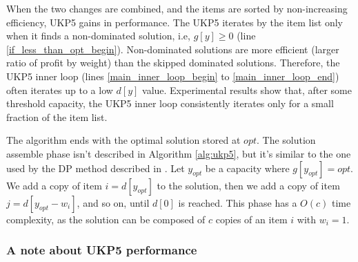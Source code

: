 \documentclass[runningheads,a4paper]{llncs}
\begin{document}
When the two changes are combined, and the items are sorted by non-increasing efficiency, UKP5 gains in performance. 
The UKP5 iterates by the item list only when it finds a non-dominated solution, i.e, \(g[y] \geq 0\) (line \ref{if_less_than_opt_begin}). 
Non-dominated solutions are more efficient (larger ratio of profit by weight) than the skipped dominated solutions. 
Therefore, the UKP5 inner loop (lines \ref{main_inner_loop_begin} to \ref{main_inner_loop_end}) often iterates up to a low \(d[y]\) value. 
Experimental results show that, after some threshold capacity, the UKP5 inner loop consistently iterates only for a small fraction of the item list.


The algorithm ends with the optimal solution stored at \(opt\). The solution assemble phase isn't described in Algorithm \ref{alg:ukp5}, but it's similar to the one used by the DP method described in \cite[p. 221, Steps 6-8]{gar72}. 
Let \(y_{opt}\) be a capacity where \(g[y_{opt}] = opt\). We add a copy of item \(i = d[y_{opt}]\) to the solution, then we add a copy of item \(j = d[y_{opt} - w_i]\), and so on, until \(d[0]\) is reached. 
This phase has a \(O(c)\) time complexity, as the solution can be composed of \(c\) copies of an item \(i\) with \(w_i = 1\).

\subsubsection{A note about UKP5 performance}
\end{document}

